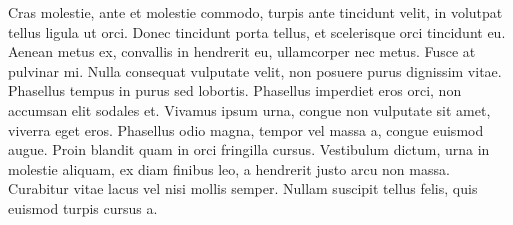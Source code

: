 Cras molestie, ante et molestie commodo, turpis ante tincidunt velit, in volutpat tellus ligula ut orci. Donec tincidunt porta tellus, et scelerisque orci tincidunt eu. Aenean metus ex, convallis in hendrerit eu, ullamcorper nec metus. Fusce at pulvinar mi. Nulla consequat vulputate velit, non posuere purus dignissim vitae. Phasellus tempus in purus sed lobortis. Phasellus imperdiet eros orci, non accumsan elit sodales et. Vivamus ipsum urna, congue non vulputate sit amet, viverra eget eros. Phasellus odio magna, tempor vel massa a, congue euismod augue. Proin blandit quam in orci fringilla cursus. Vestibulum dictum, urna in molestie aliquam, ex diam finibus leo, a hendrerit justo arcu non massa. Curabitur vitae lacus vel nisi mollis semper. Nullam suscipit tellus felis, quis euismod turpis cursus a.
